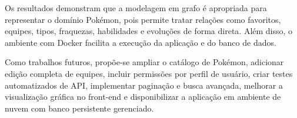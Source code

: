 \documentclass[12pt]{article}
\begin{document}
Os resultados demonstram que a modelagem em grafo é apropriada para representar o domínio Pokémon, pois permite tratar relações como favoritos, equipes, tipos, fraquezas, habilidades e evoluções de forma direta. Além disso, o ambiente com Docker facilita a execução da aplicação e do banco de dados.

Como trabalhos futuros, propõe-se ampliar o catálogo de Pokémon, adicionar edição completa de equipes, incluir permissões por perfil de usuário, criar testes automatizados de API, implementar paginação e busca avançada, melhorar a visualização gráfica no front-end e disponibilizar a aplicação em ambiente de nuvem com banco persistente gerenciado.



\end{document}
